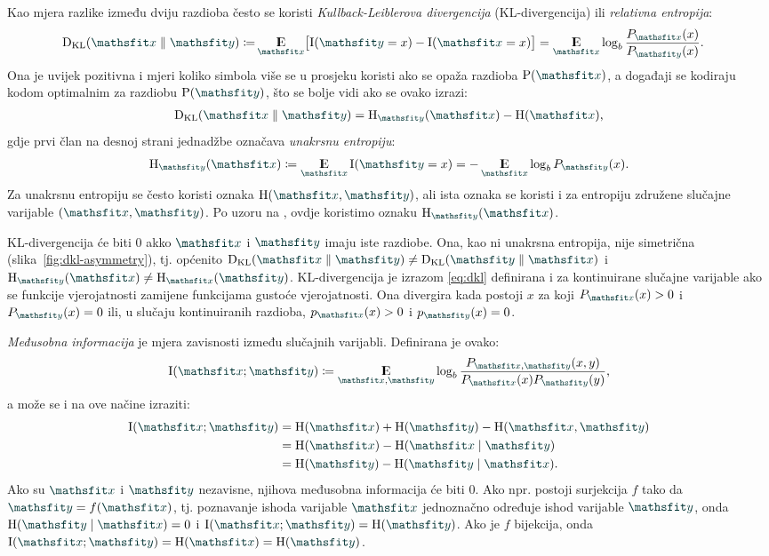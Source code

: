\documentclass[utf8, diplomski, lmodern]{fer}
\begin{document}
Kao mjera razlike između dviju razdioba često se koristi \emph{Kullback-Leiblerova divergencija} (KL-divergencija) ili \emph{relativna entropija}:
\begin{align}
	\Dkl{\rvar x}{\rvar y} \coloneqq& \E_{\rvar x}\sbr{\I(\rvar y=x) - \I(\rvar x=x)} = \E_{\rvar x} \log_b\frac{P_{\rvar x}(x)}{P_{\rvar y}(x)} \text{.}
	\label{eq:dkl}
\end{align}
Ona je uvijek pozitivna i mjeri koliko simbola više se u prosjeku koristi ako se opaža razdioba $\P(\rvar x)$, a događaji se kodiraju kodom optimalnim za razdiobu $\P(\rvar y)$, što se bolje vidi ako se ovako izrazi:
\begin{align}
\Dkl{\rvar x}{\rvar y} = \H_{\rvar y}(\rvar x) - \H(\rvar x) \text{,}
\end{align}
gdje prvi član na desnoj strani jednadžbe označava \emph{unakrsnu entropiju}:
\begin{align}
\H_{\rvar y}(\rvar x)\coloneqq \E_{\rvar x}\I(\rvar y=x) = -\E_{\rvar x}\log_b P_{\rvar y}(x) \text{.}
\end{align}
Za unakrsnu entropiju se često koristi oznaka $\H(\rvar x,\rvar y)$, ali ista oznaka se koristi i za entropiju združene slučajne varijable $(\rvar x,\rvar y)$. Po uzoru na \citet{Olah:2015:VIT}, ovdje koristimo oznaku $\H_{\rvar y}(\rvar x)$.

KL-divergencija će biti $0$ akko $\rvar x$ i $\rvar y$ imaju iste razdiobe. Ona, kao ni unakrsna entropija, nije simetrična (slika~\ref{fig:dkl-asymmetry}), tj. općenito $\Dkl{\rvar x}{\rvar y}\neq\Dkl{\rvar y}{\rvar x}$ i $\H_{\rvar y}(\rvar x)\neq\H_{\rvar x}(\rvar y)$. KL-divergencija je izrazom \eqref{eq:dkl} definirana i za kontinuirane slučajne varijable ako se funkcije vjerojatnosti zamijene funkcijama gustoće vjerojatnosti. Ona divergira kada postoji $x$ za koji $P_{\rvar x}(x)>0$ i $P_{\rvar y}(x)=0$ ili, u slučaju kontinuiranih razdioba, $p_{\rvar x}(x)>0$ i $p_{\rvar y}(x)=0$.

\emph{Međusobna informacija} je mjera zavisnosti između slučajnih varijabli. Definirana je ovako:
\begin{align}
\I\del{\rvar x;\rvar y} \coloneqq \E_{\rvar x, \rvar y} \log_b\frac{P_{\rvar x, \rvar y}(x, y)}{P_{\rvar x}(x)P_{\rvar y}(y)} \text{,}
\label{eq:mutinf}
\end{align}
a može se i na ove načine izraziti:
\begin{align}
\I(\rvar x;\rvar y)
&= \H(\rvar x)+\H(\rvar y)-\H(\rvar x, \rvar y) \\
&= \H(\rvar x)-\H(\rvar x\mid \rvar y) \\ 
&= \H(\rvar y)-\H(\rvar y\mid\rvar x) \text{.}
\label{eq:mutinf2}
\end{align}
Ako su $\rvar x$ i $\rvar y$ nezavisne, njihova međusobna informacija će biti $0$. Ako npr. postoji surjekcija $f$ tako da $\rvar y=f(\rvar x)$, tj. poznavanje ishoda varijable $\rvar x$ jednoznačno određuje ishod varijable $\rvar y$, onda $\H(\rvar y\mid\rvar x)=0$ i $\I(\rvar x;\rvar y) = \H(\rvar y)$. Ako je $f$ bijekcija, onda $\I(\rvar x;\rvar y) = \H(\rvar x) = \H(\rvar y)$.
\end{document}
